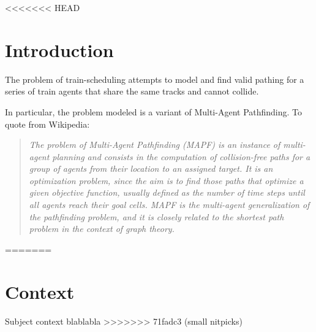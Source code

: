 <<<<<<< HEAD
\section{Introduction}
The problem of train-scheduling attempts to model and find valid pathing for a series of train agents that share the same tracks and cannot collide. 

In particular, the problem modeled is a variant of Multi-Agent Pathfinding. To quote from Wikipedia:
\begin{quote}
\emph{The problem of Multi-Agent Pathfinding (MAPF) is an instance of multi-agent planning and consists in the computation of collision-free paths for a group of agents from their location to an assigned target. It is an optimization problem, since the aim is to find those paths that optimize a given objective function, usually defined as the number of time steps until all agents reach their goal cells. MAPF is the multi-agent generalization of the pathfinding problem, and it is closely related to the shortest path problem in the context of graph theory.}
\end{quote}


=======
\section{Context}

Subject context blablabla
>>>>>>> 71fadc3 (small nitpicks)


